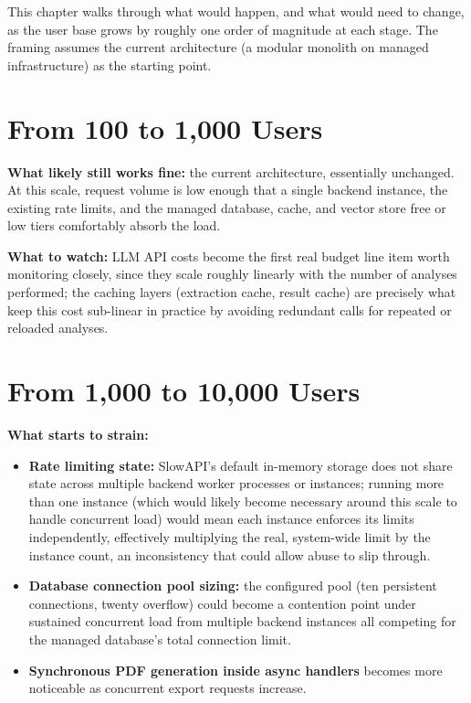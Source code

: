 \documentclass[11pt,a4paper]{report}
\begin{document}
This chapter walks through what would happen, and what would need to change, as the user base grows by roughly one order of magnitude at each stage. The framing assumes the current architecture (a modular monolith on managed infrastructure) as the starting point.

\section{From 100 to 1,000 Users}

\textbf{What likely still works fine:} the current architecture, essentially unchanged. At this scale, request volume is low enough that a single backend instance, the existing rate limits, and the managed database, cache, and vector store free or low tiers comfortably absorb the load.

\textbf{What to watch:} LLM API costs become the first real budget line item worth monitoring closely, since they scale roughly linearly with the number of analyses performed; the caching layers (extraction cache, result cache) are precisely what keep this cost sub-linear in practice by avoiding redundant calls for repeated or reloaded analyses.

\section{From 1,000 to 10,000 Users}

\textbf{What starts to strain:}
\begin{itemize}[leftmargin=*]
  \item \textbf{Rate limiting state:} SlowAPI's default in-memory storage does not share state across multiple backend worker processes or instances; running more than one instance (which would likely become necessary around this scale to handle concurrent load) would mean each instance enforces its limits independently, effectively multiplying the real, system-wide limit by the instance count, an inconsistency that could allow abuse to slip through.
  \item \textbf{Database connection pool sizing:} the configured pool (ten persistent connections, twenty overflow) could become a contention point under sustained concurrent load from multiple backend instances all competing for the managed database's total connection limit.
  \item \textbf{Synchronous PDF generation inside async handlers} becomes more noticeable as concurrent export requests increase.
\end{itemize}
\end{document}
